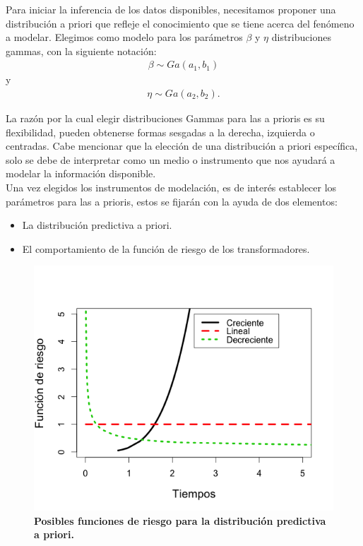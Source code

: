 \noindent Para iniciar la inferencia de los datos disponibles, necesitamos proponer una distribuci\'on a priori que refleje el conocimiento que se tiene acerca del fen\'omeno a modelar. Elegimos como modelo para los par\'ametros  $\beta$ y $\eta$ distribuciones gammas, con la siguiente notaci\'on:
\begin{eqnarray}\label{beta}
\beta\sim Ga(a_1,b_1)
\end{eqnarray}
 y 
  \begin{eqnarray}\label{eta}
 \eta\sim Ga(a_2,b_2). 
 \end{eqnarray}
 
\noindent La raz\'on por la cual elegir  distribuciones Gammas para las a  prioris  es su flexibilidad, pueden obtenerse formas sesgadas a la derecha, izquierda o centradas. Cabe mencionar que la elecci\'on de una distribuci\'on a priori  espec\'ifica, solo se debe de interpretar como un medio o instrumento  que nos ayudar\'a a modelar la informaci\'on disponible.\\[0.2cm]
 \noindent Una vez elegidos los instrumentos de modelaci\'on, es de inter\'es establecer los par\'ametros para las a prioris, estos se fijar\'an con la ayuda de dos elementos:
\begin{itemize}
\item  La distribuci\'on predictiva a priori.
\item  El comportamiento de la funci\'on de riesgo de los transformadores.
\end{itemize}

\begin{figure}
\begin{center}
\includegraphics[scale=0.4]{r1.png}
\end{center}
\vspace{-1 cm}\caption{\bf Posibles funciones de riesgo para la distribuci\'on predictiva a priori.}\label{trestt}
\end{figure}


